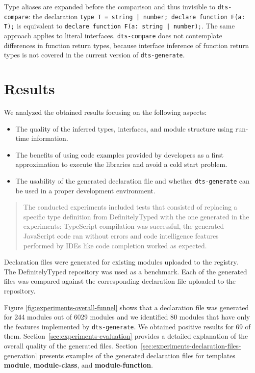 \documentclass[english,cleveref,autoref,submission]{programming}
\begin{document}
Type aliases are expanded before the comparison and thus invisible to
\texttt{dts-compare}: the declaration
\lstinline{type T = string | number; declare function F(a: T);} is equivalent to
\lstinline{declare function F(a: string | number);}. The same approach applies to literal
interfaces. \texttt{dts-compare} does 
not contemplate differences in function return types, because interface inference of
function return types is not covered in the current version of \texttt{dts-generate}. 

\section{Results}
\label{sec:results}
We analyzed the obtained results focusing on the following aspects:
\begin{itemize}
  \item The quality of the inferred types, interfaces, and module structure using run-time information.
  \item The benefits of using code examples provided by developers as a first approximation to execute the libraries and avoid a cold start problem.
  \item The usability of the generated declaration file and whether \texttt{dts-generate} can be used in a proper development environment.
\end{itemize}

\begin{quotation}
  The conducted experiments included tests that consisted of replacing
  a specific type definition from DefinitelyTyped
  \cite{definitely-typed-repository} with the one generated in the
  experiments: TypeScript compilation was successful, the generated
  JavaScript code ran without errors and code intelligence features
  performed by IDEs like code completion worked as expected.
\end{quotation}

Declaration files were generated for existing modules uploaded to the
\NPM{} registry. The DefinitelyTyped repository was used as a
benchmark. Each of the generated files was compared against the
corresponding declaration file uploaded to the repository.

Figure \ref{fig:experiments-overall-funnel} shows that a declaration file was generated
for 244 modules out of 6029 modules and we identified 80 modules that have only the
features implemented by \texttt{dts-generate}. We obtained positive results for 69 of
them. Section~\ref{sec:experiments-evaluation} provides a detailed explanation of the overall
quality of the generated files.
Section~\ref{sec:experiments-declaration-files-generation} presents examples of the generated declaration files for
templates \textbf{module}, \textbf{module-class}, and \textbf{module-function}. 
\end{document}

